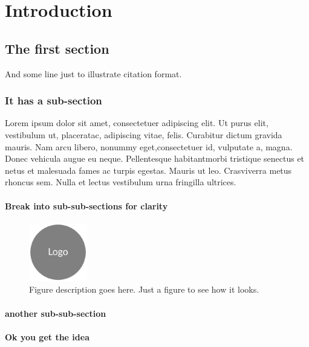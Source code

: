 \documentclass[a4paper, oneside, 11pt]{book}
\begin{document}
\chapter{Introduction}
\label{ch:intro}

\section{The first section}
\label{sec:microbiome}
\lipsum[1] And some line just to illustrate citation \supercite{example} format.

  \subsection{It has a sub-section}

  Lorem ipsum dolor sit amet, consectetuer adipiscing elit. Ut purus elit, vestibulum ut, placeratac, adipiscing vitae, felis. Curabitur dictum gravida mauris. Nam arcu libero, nonummy eget,consectetuer id, vulputate a, magna. Donec vehicula augue eu neque. Pellentesque habitantmorbi tristique senectus et netus et malesuada fames ac turpis egestas. Mauris ut leo. Crasviverra metus rhoncus sem. Nulla et lectus vestibulum urna fringilla ultrices.

      \subsubsection{Break into sub-sub-sections for clarity}
      \lipsum[1]
			\begin{figure}
			  \centering
				\includegraphics[width=1in, keepaspectratio]{logo.png}
				\caption[Appears in figure list]{\small Figure description goes here. Just a figure to see how it looks.}
			\end{figure}

      \subsubsection{another sub-sub-section}
      \lipsum[1-2]

      \subsubsection{Ok you get the idea}
      \lipsum[1]
\end{document}
